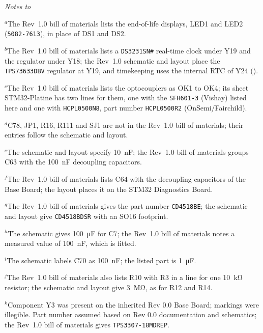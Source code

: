 \par\nopagebreak
{\footnotesize\setlength{\parindent}{0pt}\setlength{\parskip}{0.2em}
\textit{Notes to }\par\nopagebreak
$^{a}$The Rev~1.0 bill of materials lists the end-of-life displays, LED1 and LED2 (\texttt{5082-7613}), in place of DS1 and DS2.\par
$^{b}$The Rev~1.0 bill of materials lists a \texttt{DS3231SN\#} real-time clock under Y19 and the regulator under Y18; the Rev~1.0 schematic and layout place the \texttt{TPS73633DBV} regulator at Y19, and timekeeping uses the internal RTC of Y24 ().\par
$^{c}$The Rev~1.0 bill of materials lists the optocouplers as OK1 to OK4; its sheet STM32-Platine has two lines for them, one with the \texttt{SFH601-3} (Vishay) listed here and one with \texttt{HCPL0500N8}, part number \texttt{HCPL0500R2} (OnSemi/Fairchild).\par
$^{d}$C78, JP1, R16, R111 and SJ1 are not in the Rev~1.0 bill of materials; their entries follow the schematic and layout.\par
$^{e}$The schematic and layout specify \SI{10}{\nano\farad}; the Rev~1.0 bill of materials groups C63 with the \SI{100}{\nano\farad} decoupling capacitors.\par
$^{f}$The Rev~1.0 bill of materials lists C64 with the decoupling capacitors of the Base Board; the layout places it on the STM32 Diagnostics Board.\par
$^{g}$The Rev~1.0 bill of materials gives the part number \texttt{CD4518BE}; the schematic and layout give \texttt{CD4518BDSR} with an SO16 footprint.\par
$^{h}$The schematic gives \SI{100}{\micro\farad} for C7; the Rev~1.0 bill of materials notes a measured value of \SI{100}{\nano\farad}, which is fitted.\par
$^{i}$The schematic labels C70 as \SI{100}{\nano\farad}; the listed part is \SI{1}{\micro\farad}.\par
$^{j}$The Rev~1.0 bill of materials also lists R10 with R3 in a line for one \SI{10}{\kilo\ohm} resistor; the schematic and layout give \SI{3}{\mega\ohm}, as for R12 and R14.\par
$^{k}$Component Y3 was present on the inherited Rev 0.0 Base Board; markings were illegible. Part number assumed based on Rev 0.0 documentation and schematics; the Rev~1.0 bill of materials gives \texttt{TPS3307-18MDREP}.\par
}
